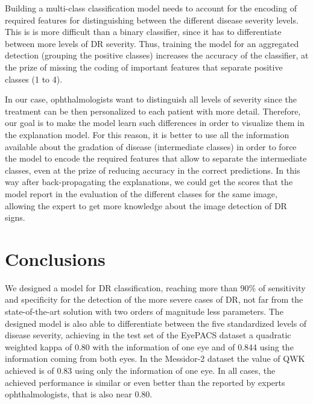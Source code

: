 \begin{table}[ht]
	\centering
	\caption{Prediction performance \& model complexity comparison of our proposal vs the state-of-the-art model (Messidor-2 data set)}
	\label{class2:tab:bench} 
\end{table}

Building a multi-class classification model needs to account for the encoding of required features for distinguishing between the different disease severity levels. This is is more difficult than a binary classifier, since it has to differentiate between more levels of DR severity. Thus, training the model for an aggregated detection (grouping the positive classes) increases the accuracy of the classifier, at the prize of missing the coding of important features that separate positive classes (1 to 4).

In our case, ophthalmologists want to distinguish all levels of severity since the treatment can be then personalized to each patient with more detail. Therefore, our goal is to make the model learn such differences in order to visualize them in the explanation model. For this reason, it is better to use all the information available about the gradation of disease (intermediate classes) in order to force the model to encode the required features that allow to separate the intermediate classes, even at the prize of reducing accuracy in the correct predictions. In this way after back-propagating the explanations, we could get the scores that the model report in the evaluation of the different classes for the same image, allowing the expert to get more knowledge about the image detection of DR signs.

\section{Conclusions}\label{class2:sec:conclusions}

We designed a model for DR classification, reaching more than 90\% of sensitivity and specificity for the detection of the more severe cases of DR, not far from the state-of-the-art solution with two orders of magnitude less parameters. The designed model is also able to differentiate between the five standardized levels of disease severity, achieving in the test set of the EyePACS dataset a quadratic weighted kappa of 0.80 with the information of one eye and of 0.844 using the information coming from both eyes. In the Messidor-2 dataset the value of QWK achieved is of 0.83 using only the information of one eye. In all cases, the achieved performance is similar or even better than the reported by experts ophthalmologists, that is also near 0.80.

